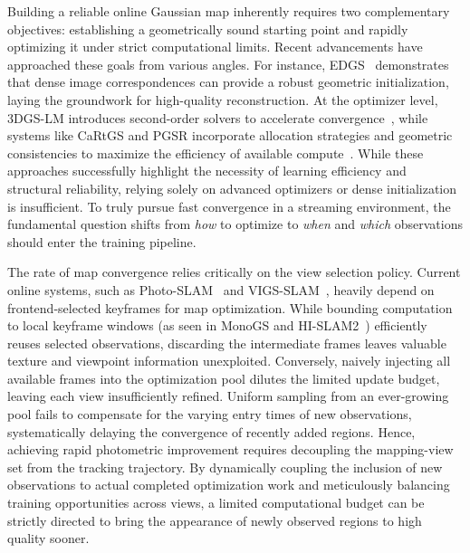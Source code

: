Building a reliable online Gaussian map inherently requires two complementary objectives: establishing a geometrically sound starting point and rapidly optimizing it under strict computational limits. 
Recent advancements have approached these goals from various angles. For instance, EDGS~\cite{edgs} demonstrates that dense image correspondences can provide a robust geometric initialization, laying the groundwork for high-quality reconstruction. At the optimizer level, 3DGS-LM introduces second-order solvers to accelerate convergence~\cite{hollein2025gslm}, while systems like CaRtGS and PGSR incorporate allocation strategies and geometric consistencies to maximize the efficiency of available compute~\cite{cartgs, chen2024pgsr}. 
While these approaches successfully highlight the necessity of learning efficiency and structural reliability, relying solely on advanced optimizers or dense initialization is insufficient. To truly pursue fast convergence in a streaming environment, the fundamental question shifts from \emph{how} to optimize to \emph{when} and \emph{which} observations should enter the training pipeline.




The rate of map convergence relies critically on the view selection policy. Current online systems, such as Photo-SLAM~\cite{huang2024photoslam} and VIGS-SLAM~\cite{vigsslam}, heavily depend on frontend-selected keyframes for map optimization. While bounding computation to local keyframe windows (as seen in MonoGS and HI-SLAM2~\cite{matsuki2024monogs,zhang2025hislam2}) efficiently reuses selected observations, discarding the intermediate frames leaves valuable texture and viewpoint information unexploited. 
Conversely, naively injecting all available frames into the optimization pool dilutes the limited update budget, leaving each view insufficiently refined. Uniform sampling from an ever-growing pool fails to compensate for the varying entry times of new observations, systematically delaying the convergence of recently added regions. Hence, achieving rapid photometric improvement requires decoupling the mapping-view set from the tracking trajectory. By dynamically coupling the inclusion of new observations to actual completed optimization work and meticulously balancing training opportunities across views, a limited computational budget can be strictly directed to bring the appearance of newly observed regions to high quality sooner.

